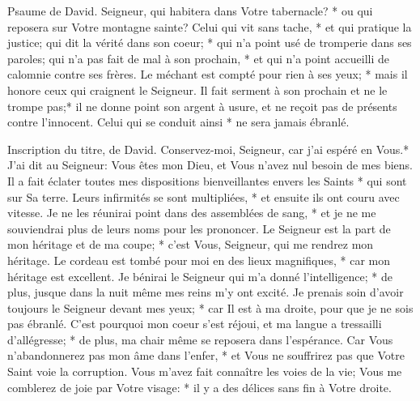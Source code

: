 Psaume de David. Seigneur, qui habitera dans Votre tabernacle? * ou qui reposera sur Votre montagne sainte?
Celui qui vit sans tache, * et qui pratique la justice;
qui dit la vérité dans son coeur; * qui n'a point usé de tromperie dans ses paroles; qui n'a pas fait de mal à son prochain, * et qui n'a point accueilli de calomnie contre ses frères.
Le méchant est compté pour rien à ses yeux; * mais il honore ceux qui craignent le Seigneur. Il fait serment à son prochain et ne le trompe pas;*
il ne donne point son argent à usure, et ne reçoit pas de présents contre l'innocent. Celui qui se conduit ainsi * ne sera jamais ébranlé.

Inscription du titre, de David. Conservez-moi, Seigneur, car j'ai espéré en Vous.*
J'ai dit au Seigneur: Vous êtes mon Dieu, et Vous n'avez nul besoin de mes biens.
Il a fait éclater toutes mes dispositions bienveillantes envers les Saints * qui sont sur Sa terre.
Leurs infirmités se sont multipliées, * et ensuite ils ont couru avec vitesse. Je ne les réunirai point dans des assemblées de sang, * et je ne me souviendrai plus de leurs noms pour les prononcer.
Le Seigneur est la part de mon héritage et de ma coupe; * c'est Vous, Seigneur, qui me rendrez mon héritage.
Le cordeau est tombé pour moi en des lieux magnifiques, * car mon héritage est excellent.
Je bénirai le Seigneur qui m'a donné l'intelligence; * de plus, jusque dans la nuit même mes reins m'y ont excité.
Je prenais soin d'avoir toujours le Seigneur devant mes yeux; * car Il est à ma droite, pour que je ne sois pas ébranlé.
C'est pourquoi mon coeur s'est réjoui, et ma langue a tressailli d'allégresse; * de plus, ma chair même se reposera dans l'espérance.
Car Vous n'abandonnerez pas mon âme dans l'enfer, * et Vous ne souffrirez pas que Votre Saint voie la corruption.
Vous m'avez fait connaître les voies de la vie; Vous me comblerez de joie par Votre visage: * il y a des délices sans fin à Votre droite.

